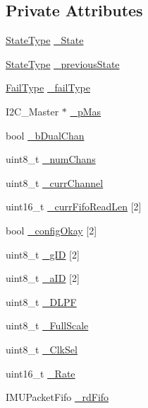 \subsection*{Private Attributes}
\begin{DoxyCompactItemize}
\item 
\hyperlink{class_i_m_u_a7b5e1bf1cf1407b3e4cf0dd2e18b523f}{StateType} \hyperlink{class_i_m_u_a2e3c70d02cc2b3dd98ce8153d02cf04e}{\_\-State}
\item 
\hyperlink{class_i_m_u_a7b5e1bf1cf1407b3e4cf0dd2e18b523f}{StateType} \hyperlink{class_i_m_u_aca284ca1bcf10458005d4ca630833ea9}{\_\-previousState}
\item 
\hyperlink{class_i_m_u_a4edeb07a848734657792b4ef8749fb97}{FailType} \hyperlink{class_i_m_u_a39ed63b67b50c67520c5f8e5a2c26b26}{\_\-failType}
\item 
I2C\_\-Master $\ast$ \hyperlink{class_i_m_u_a466148932203b7250c83a4c5bb684ca1}{\_\-pMas}
\item 
bool \hyperlink{class_i_m_u_a62978e791838c3b4829e1d3d683e99b2}{\_\-bDualChan}
\item 
uint8\_\-t \hyperlink{class_i_m_u_a27df580b4559aaf3234469bfe16eb158}{\_\-numChans}
\item 
uint8\_\-t \hyperlink{class_i_m_u_a08a36cacd3d4d14b4aa834a657422b15}{\_\-currChannel}
\item 
uint16\_\-t \hyperlink{class_i_m_u_aa9a352174cae0cd174cb91ef09a47fe4}{\_\-currFifoReadLen} \mbox{[}2\mbox{]}
\item 
bool \hyperlink{class_i_m_u_a53aa928d2d68a5287da893bd157e7cbe}{\_\-configOkay} \mbox{[}2\mbox{]}
\item 
uint8\_\-t \hyperlink{class_i_m_u_a47ffe20a032e3a890cd3891793a60a40}{\_\-gID} \mbox{[}2\mbox{]}
\item 
uint8\_\-t \hyperlink{class_i_m_u_a10141bdc27465c95de6c8285d1542d78}{\_\-aID} \mbox{[}2\mbox{]}
\item 
uint8\_\-t \hyperlink{class_i_m_u_a3f9e6159234449cde8f5e72da8acf751}{\_\-DLPF}
\item 
uint8\_\-t \hyperlink{class_i_m_u_a059c02011a10bb90aecc9692ed345771}{\_\-FullScale}
\item 
uint8\_\-t \hyperlink{class_i_m_u_a4dbeaf17fd1ae9b41b5c3fe61706e5f1}{\_\-ClkSel}
\item 
uint16\_\-t \hyperlink{class_i_m_u_aafe9be107385c7ccedeb1539cf6d7fce}{\_\-Rate}
\item 
IMUPacketFifo \hyperlink{class_i_m_u_a43cbdffbfb85749212ede7f78ab6f1e0}{\_\-rdFifo}
\item 

\end{DoxyCompactItemize}
